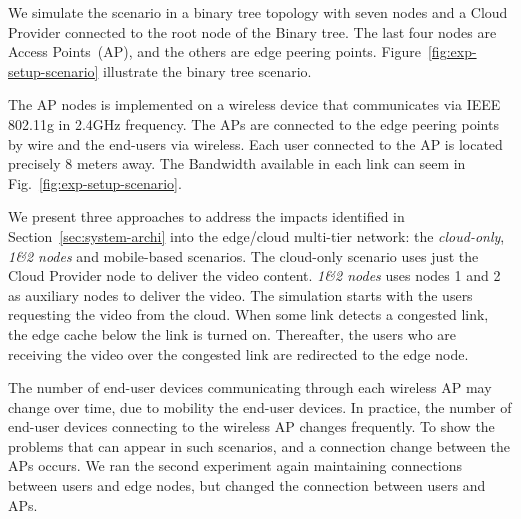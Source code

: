 

We simulate the scenario in a binary tree topology with seven nodes and a Cloud Provider connected to the root node of the Binary tree. The last four nodes are Access Points~(AP), and the others are edge peering points. Figure~\ref{fig:exp-setup-scenario} illustrate the binary tree scenario.

The AP nodes is implemented on a wireless device that communicates via IEEE 802.11g in 2.4GHz frequency. The APs are connected to the edge peering points by wire and the end-users via wireless. Each user connected to the AP is located precisely 8 meters away. The Bandwidth available in each link can seem in Fig.~\ref{fig:exp-setup-scenario}.

We present three approaches to address the impacts identified in Section~\ref{sec:system-archi} into the edge/cloud multi-tier network: the \textit{cloud-only}, \textit{1\&2 nodes} and mobile-based scenarios. The cloud-only scenario uses just the Cloud Provider node to deliver the video content. \textit{1\&2 nodes} uses nodes 1 and 2 as auxiliary nodes to deliver the video. The simulation starts with the users requesting the video from the cloud. When some link detects a congested link, the edge cache below the link is turned on. Thereafter, the users who are receiving the video over the congested link are redirected to the edge node. 

The number of end-user devices communicating through each wireless AP may change over time, due to mobility the end-user devices. In practice, the number of end-user devices connecting to the wireless AP changes frequently. 
To show the problems that can appear in such scenarios, and a connection change between the APs occurs. We ran the second experiment again maintaining connections between users and edge nodes, but changed the connection between users and APs.


